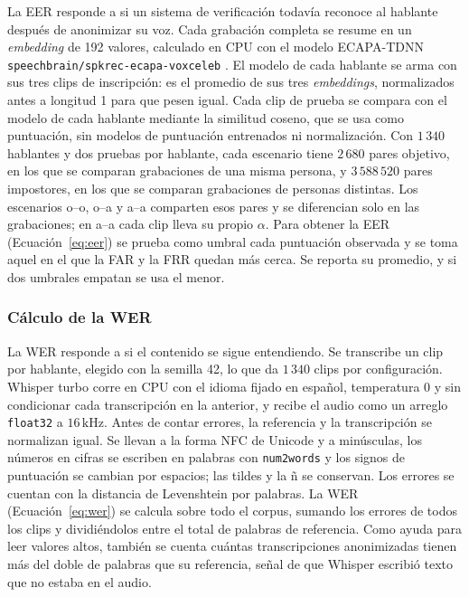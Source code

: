 \documentclass[10pt,twocolumn]{article}
\newcommand{\parencite}[1]{\citep{#1}}
\begin{document}
La EER responde a si un sistema de verificación todavía reconoce al hablante después de anonimizar su voz. Cada grabación completa se resume en un \textit{embedding} de 192 valores, calculado en CPU con el modelo ECAPA-TDNN \texttt{speechbrain/spkrec-ecapa-voxceleb} \parencite{speechbrainModel}. El modelo de cada hablante se arma con sus tres clips de inscripción: es el promedio de sus tres \textit{embeddings}, normalizados antes a longitud 1 para que pesen igual. Cada clip de prueba se compara con el modelo de cada hablante mediante la similitud coseno, que se usa como puntuación, sin modelos de puntuación entrenados ni normalización. Con $1\,340$ hablantes y dos pruebas por hablante, cada escenario tiene $2\,680$ pares objetivo, en los que se comparan grabaciones de una misma persona, y $3\,588\,520$ pares impostores, en los que se comparan grabaciones de personas distintas. Los escenarios o--o, o--a y a--a comparten esos pares y se diferencian solo en las grabaciones; en a--a cada clip lleva su propio $\alpha$. Para obtener la EER (Ecuación~\ref{eq:eer}) se prueba como umbral cada puntuación observada y se toma aquel en el que la FAR y la FRR quedan más cerca. Se reporta su promedio, y si dos umbrales empatan se usa el menor.

\subsubsection{Cálculo de la WER}\label{sec:4.5.3}

La WER responde a si el contenido se sigue entendiendo. Se transcribe un clip por hablante, elegido con la semilla 42, lo que da $1\,340$ clips por configuración. Whisper turbo \parencite{openaiwhisper2025} corre en CPU con el idioma fijado en español, temperatura 0 y sin condicionar cada transcripción en la anterior, y recibe el audio como un arreglo \texttt{float32} a $16\,\mathrm{kHz}$. Antes de contar errores, la referencia y la transcripción se normalizan igual. Se llevan a la forma NFC de Unicode y a minúsculas, los números en cifras se escriben en palabras con \texttt{num2words} y los signos de puntuación se cambian por espacios; las tildes y la ñ se conservan. Los errores se cuentan con la distancia de Levenshtein por palabras. La WER (Ecuación~\ref{eq:wer}) se calcula sobre todo el corpus, sumando los errores de todos los clips y dividiéndolos entre el total de palabras de referencia. Como ayuda para leer valores altos, también se cuenta cuántas transcripciones anonimizadas tienen más del doble de palabras que su referencia, señal de que Whisper escribió texto que no estaba en el audio.
\end{document}
